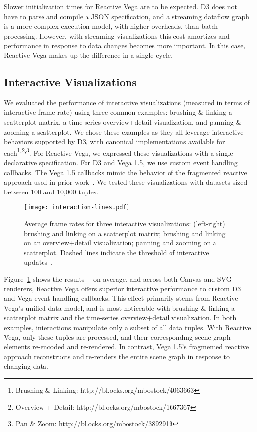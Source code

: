 Slower initialization times for Reactive Vega are to be expected. D3 does not
have to parse and compile a JSON specification, and a streaming dataflow graph
is a more complex execution model, with higher overheads, than batch processing.
However, with streaming visualizations this cost amortizes and performance in
response to data changes becomes more important. In this case, Reactive Vega
makes up the difference in a single cycle.

\vspace{-20pt}

\subsection{Interactive Visualizations}

\vspace{-7pt}

We evaluated the performance of interactive visualizations (measured in terms of
interactive frame rate) using three common examples: brushing \& linking a
scatterplot matrix, a time-series overview+detail visualization, and panning \&
zooming a scatterplot. We chose these examples as they all leverage interactive
behaviors supported by D3, with canonical implementations available for
each\footnote{Brushing \& Linking:
http://bl.ocks.org/mbostock/4063663}\textsuperscript{,}\footnote{Overview +
Detail: http://bl.ocks.org/mbostock/1667367}\textsuperscript{,}\footnote{Pan \&
Zoom: http://bl.ocks.org/mbostock/3892919}. For Reactive Vega, we expressed
these visualizations with a single declarative specification. For D3 and Vega
1.5, we use custom event handling callbacks. The Vega 1.5 callbacks mimic the
behavior of the fragmented reactive approach used in prior
work~\cite{satyanarayan:declarative}. We tested these visualizations with
datasets sized between 100 and 10,000 tuples.

\begin{figure}[t!]
  \centering
  \texttt{[image: interaction-lines.pdf]}
  \caption{Average frame rates for three interactive visualizations: (left-right)
  brushing and linking on a scatterplot matrix; brushing and linking on an
  overview+detail visualization; panning and zooming on a scatterplot. Dashed
  lines indicate the threshold of interactive updates~\cite{card:modelhuman}.}
  \label{fig:vg:interactive_benchmark}
\end{figure}

Figure~\ref{fig:vg:interactive_benchmark} shows the results\,---\,on average,
and across both Canvas and SVG renderers, Reactive Vega offers superior
interactive performance to custom D3 and Vega event handling callbacks. This
effect primarily stems from Reactive Vega's unified data model, and is most
noticeable with brushing \& linking a scatterplot matrix and the time-series
overview+detail visualization. In both examples, interactions manipulate only a
subset of all data tuples. With Reactive Vega, only these tuples are processed,
and their corresponding scene graph elements re-encoded and re-rendered. In
contrast, Vega 1.5's fragmented reactive approach reconstructs and re-renders
the entire scene graph in response to changing data.